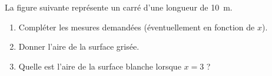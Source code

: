 
\begin{exercice}\label{exo2smath-0008}

    La figure suivante représente un carré d'une longueur de \SI{10}{\meter}.
\begin{center}

\end{center}

    \begin{enumerate}
        \item
            Compléter les mesures demandées (éventuellement en fonction de \( x\)).
        \item
            Donner l'aire de la surface grisée.
        \item
            Quelle est l'aire de la surface blanche lorsque \( x=3\) ?
    \end{enumerate}


\end{exercice}
